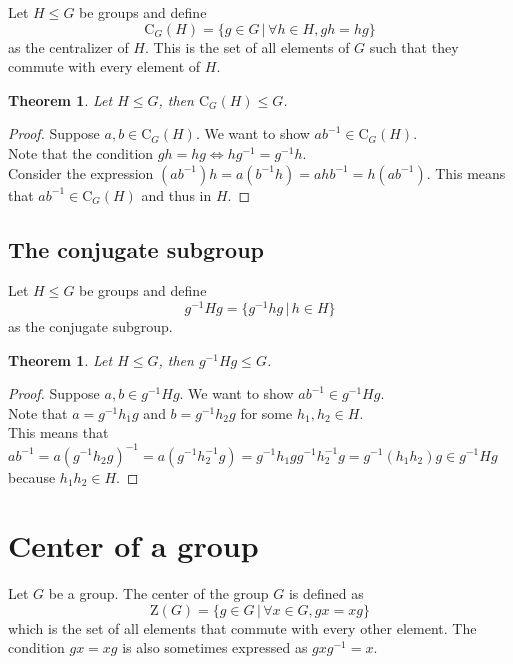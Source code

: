 \documentclass[a4paper]{article}
\begin{document}
Let \(H \leq G\) be groups and define
\[
    \text{C}_G(H) = \{
        g \in G \,|\, \forall h \in H, gh=hg
    \}
\]
as the centralizer of \(H\).
This is the set of all elements of \(G\) such that they commute with every element of \(H\).

\newtheorem*{theorem2}{Theorem}

\begin{theorem2}
    Let \(H \leq G\), then \(\text{C}_G(H) \leq G\).
\end{theorem2}
\begin{proof}
    Suppose \(a,b \in \text{C}_G(H)\).
    We want to show \(ab^{-1} \in \text{C}_G(H)\).\\
    Note that the condition \(gh=hg \iff hg^{-1}=g^{-1}h\).\\
    Consider the expression \((ab^{-1})h = a(b^{-1}h) = ahb^{-1} = h(ab^{-1})\).
    This means that \(ab^{-1} \in \text{C}_G(H)\) and thus in \(H\).
\end{proof}

\subsection{The conjugate subgroup}

Let \(H \leq G\) be groups and define
\[
    g^{-1}Hg = \{
        g^{-1}hg \,|\, h \in H    
    \}
\]
as the conjugate subgroup.

\newtheorem*{theorem3}{Theorem}

\begin{theorem3}
    Let \(H \leq G\), then \(g^{-1}Hg \leq G\).
\end{theorem3}
\begin{proof}
    Suppose \(a,b \in g^{-1}Hg\).
    We want to show \(ab^{-1} \in g^{-1}Hg\).\\
    Note that \(a = g^{-1}h_1g\) and \(b = g^{-1}h_2g\)
    for some \(h_1, h_2 \in H\). \\
    This means that \(ab^{-1}=a{(g^{-1}h_2g)}^{-1} = a(g^{-1}h_2^{-1}g)
    =g^{-1}h_1gg^{-1}h_2^{-1}g = g^{-1} (h_1h_2) g \in g^{-1}Hg \)
    because \(h_1h_2 \in H\).
\end{proof}

\section{Center of a group}

Let \(G\) be a group. The center of the group \(G\) is defined as
\[
    \text{Z}(G) = \{
        g \in G \,|\, \forall x \in G, gx = xg
    \}
\]
which is the set of all elements that commute with every other element.
The condition \(gx=xg\) is also sometimes expressed as \(gxg^{-1} = x\).
\end{document}
